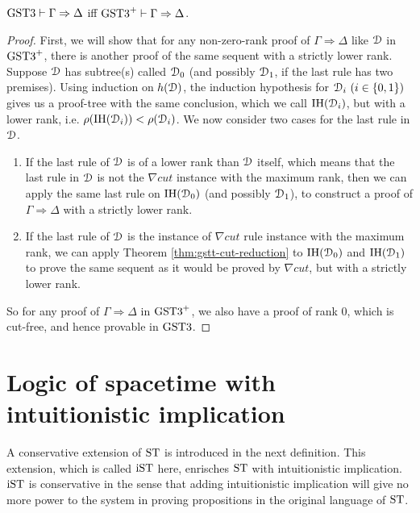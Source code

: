 \documentclass[10pt,a4paper]{amsart}
\begin{document}
\begin{thm}\label{thm:gstt-eq-gsttp}
	$\text{GST3} \vdash \Gamma \Rightarrow \Delta$ iff $\text{GST3}^+ \vdash \Gamma \Rightarrow \Delta$.
\end{thm}
\begin{proof}
	First, we will show that for any non-zero-rank proof of $\Gamma \Rightarrow \Delta$ like $\mathcal{D}$ in $\text{GST3}^+$, there is another proof of the same sequent with a strictly lower rank. Suppose $\mathcal{D}$ has subtree(s) called $\mathcal{D}_0$ (and possibly $\mathcal{D}_1$, if the last rule has two premises). Using induction on $h(\mathcal{D})$, the induction hypothesis for $\mathcal{D}_i ~(i \in \{0,1\})$ gives us a proof-tree with the same conclusion, which we call $\text{IH}(\mathcal{D}_i)$, but with a lower rank, i.e. $\rho(\text{IH}(\mathcal{D}_i)) < \rho(\mathcal{D}_i)$. We now consider two cases for the last rule in $\mathcal{D}$.

	\begin{enumerate}[label=\Roman*]
		\item If the last rule of $\mathcal{D}$ is of a lower rank than $\mathcal{D}$ itself, which means that the last rule in $\mathcal{D}$ is not the $\nabla cut$ instance with the maximum rank, then we can apply the same last rule on $\text{IH}(\mathcal{D}_0)$ (and possibly $\mathcal{D}_1$), to construct a proof of $\Gamma \Rightarrow \Delta$ with a strictly lower rank.
		
		\item If the last rule of $\mathcal{D}$ is the instance of $\nabla cut$ rule instance with the maximum rank, we can apply Theorem \ref{thm:gstt-cut-reduction} to $\text{IH}(\mathcal{D}_0)$ and $\text{IH}(\mathcal{D}_1)$ to prove the same sequent as it would be proved by $\nabla cut$, but with a strictly lower rank.
	\end{enumerate}
	So for any proof of $\Gamma \Rightarrow \Delta$ in $\text{GST3}^+$, we also have a proof of rank $0$, which is cut-free, and hence provable in $\text{GST3}$.
\end{proof}



\section{Logic of spacetime with intuitionistic implication}

A conservative extension of $\text{ST}$ is introduced in the next definition. This extension, which is called $\text{iST}$ here, enrisches $\text{ST}$ with intuitionistic implication. $\text{iST}$ is conservative in the sense that adding intuitionistic implication will give no more power to the system in proving propositions in the original language of $\text{ST}$.
\end{document}

